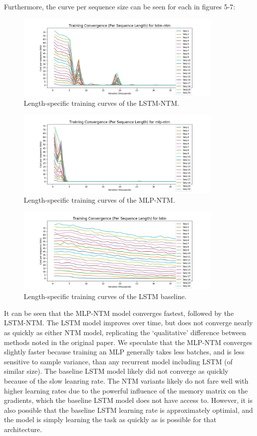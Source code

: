 \documentclass{amsart}
\numberwithin{equation}{section}
\theoremstyle{definition}
\theoremstyle{remark}
\begin{document}
Furthermore, the curve per sequence size can be seen for each in figures 5-7:\\

\begin{figure}[h]
\includegraphics[width=100mm]{outputs/lstm-ntm_convergence-perlen}
\caption{Length-specific training curves of the LSTM-NTM.}
\label{Figure 5}
\end{figure}

\begin{figure}[h]
\includegraphics[width=100mm]{outputs/mlp-ntm_convergence-perlen}
\caption{Length-specific training curves of the MLP-NTM.}
\label{Figure 6}
\end{figure}

\begin{figure}[h]
\includegraphics[width=100mm]{outputs/lstm_convergence-perlen}
\caption{Length-specific training curves of the LSTM baseline.}
\label{Figure 7}
\end{figure}

It can be seen that the MLP-NTM model converges fastest, followed by the
LSTM-NTM. The LSTM model improves over time, but does not converge nearly as
quickly as either NTM model, replicating the `qualitative' difference between
methods noted in the original paper. We speculate that the MLP-NTM converges
slightly faster because training an MLP generally takes less batches, and
is less sensitive to sample variance, than any recurrent model including
LSTM (of similar size). The baseline LSTM model likely did not converge
as quickly because of the slow leanring rate. The NTM variants likely
do not fare well with higher learning rates due to the powerful influence
of the memory matrix on the gradients, which the baseline LSTM model does
not have access to. However, it is also possible that the baseline LSTM
learning rate is approximately optimial, and the model is simply learning
the task as quickly as is possible for that architecture. \\
\end{document}
